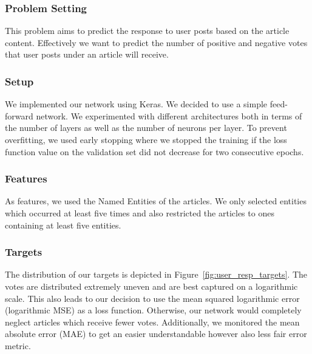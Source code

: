 \documentclass[acmsmall]{acmart}
\begin{document}
\subsubsection{Problem Setting}
This problem aims to predict the response to user posts based on the article content. Effectively we want to predict the number of positive and negative votes that user posts under an article will receive. 

\subsubsection{Setup}
We implemented our network using Keras. We decided to use a simple feed-forward network. We experimented with different architectures both in terms of the number of layers as well as the number of neurons per layer. To prevent overfitting, we used early stopping where we stopped the training if the loss function value on the validation set did not decrease for two consecutive epochs. 

\subsubsection{Features}
As features, we used the Named Entities of the articles. We only selected entities which occurred at least five times and also restricted the articles to ones containing at least five entities. 

\subsubsection{Targets}
The distribution of our targets is depicted in Figure~\ref{fig:user_resp_targets}. The votes are distributed extremely uneven and are best captured on a logarithmic scale. This also leads to our decision to use the mean squared logarithmic error (logarithmic MSE) as a loss function. Otherwise, our network would completely neglect articles which receive fewer votes. Additionally, we monitored the mean absolute error (MAE) to get an easier understandable however also less fair error metric.  
\end{document}
